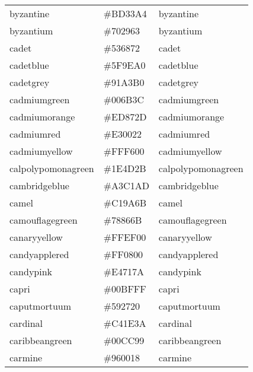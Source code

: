 \documentclass[
]{article}
\begin{document}
\begin{longtable}[]{@{}lll@{}}
byzantine & \colorbox[rgb]{0.74,0.2,0.64}{\#BD33A4} &
\textcolor[rgb]{0.74,0.2,0.64}{byzantine             }\tabularnewline
byzantium & \colorbox[rgb]{0.44,0.16,0.39}{\#702963} &
\textcolor[rgb]{0.44,0.16,0.39}{byzantium             }\tabularnewline
cadet & \colorbox[rgb]{0.33,0.41,0.47}{\#536872} &
\textcolor[rgb]{0.33,0.41,0.47}{cadet                 }\tabularnewline
cadetblue & \colorbox[rgb]{0.37,0.62,0.63}{\#5F9EA0} &
\textcolor[rgb]{0.37,0.62,0.63}{cadetblue             }\tabularnewline
cadetgrey & \colorbox[rgb]{0.57,0.64,0.69}{\#91A3B0} &
\textcolor[rgb]{0.57,0.64,0.69}{cadetgrey             }\tabularnewline
cadmiumgreen & \colorbox[rgb]{0.0,0.42,0.24}{\#006B3C} &
\textcolor[rgb]{0.0,0.42,0.24}{cadmiumgreen          }\tabularnewline
cadmiumorange & \colorbox[rgb]{0.93,0.53,0.18}{\#ED872D} &
\textcolor[rgb]{0.93,0.53,0.18}{cadmiumorange         }\tabularnewline
cadmiumred & \colorbox[rgb]{0.89,0.0,0.13}{\#E30022} &
\textcolor[rgb]{0.89,0.0,0.13}{cadmiumred            }\tabularnewline
cadmiumyellow & \colorbox[rgb]{1.0,0.96,0.0}{\#FFF600} &
\textcolor[rgb]{1.0,0.96,0.0}{cadmiumyellow         }\tabularnewline
calpolypomonagreen & \colorbox[rgb]{0.12,0.3,0.17}{\#1E4D2B} &
\textcolor[rgb]{0.12,0.3,0.17}{calpolypomonagreen    }\tabularnewline
cambridgeblue & \colorbox[rgb]{0.64,0.76,0.68}{\#A3C1AD} &
\textcolor[rgb]{0.64,0.76,0.68}{cambridgeblue         }\tabularnewline
camel & \colorbox[rgb]{0.76,0.6,0.42}{\#C19A6B} &
\textcolor[rgb]{0.76,0.6,0.42}{camel                 }\tabularnewline
camouflagegreen & \colorbox[rgb]{0.47,0.53,0.42}{\#78866B} &
\textcolor[rgb]{0.47,0.53,0.42}{camouflagegreen       }\tabularnewline
canaryyellow & \colorbox[rgb]{1.0,0.94,0.0}{\#FFEF00} &
\textcolor[rgb]{1.0,0.94,0.0}{canaryyellow          }\tabularnewline
candyapplered & \colorbox[rgb]{1.0,0.03,0.0}{\#FF0800} &
\textcolor[rgb]{1.0,0.03,0.0}{candyapplered         }\tabularnewline
candypink & \colorbox[rgb]{0.89,0.44,0.48}{\#E4717A} &
\textcolor[rgb]{0.89,0.44,0.48}{candypink             }\tabularnewline
capri & \colorbox[rgb]{0.0,0.75,1.0}{\#00BFFF} &
\textcolor[rgb]{0.0,0.75,1.0}{capri                 }\tabularnewline
caputmortuum & \colorbox[rgb]{0.35,0.15,0.13}{\#592720} &
\textcolor[rgb]{0.35,0.15,0.13}{caputmortuum          }\tabularnewline
cardinal & \colorbox[rgb]{0.77,0.12,0.23}{\#C41E3A} &
\textcolor[rgb]{0.77,0.12,0.23}{cardinal              }\tabularnewline
caribbeangreen & \colorbox[rgb]{0.0,0.8,0.6}{\#00CC99} &
\textcolor[rgb]{0.0,0.8,0.6}{caribbeangreen        }\tabularnewline
carmine & \colorbox[rgb]{0.59,0.0,0.09}{\#960018} &
\textcolor[rgb]{0.59,0.0,0.09}{carmine               }\tabularnewline

\end{longtable}
\end{document}
